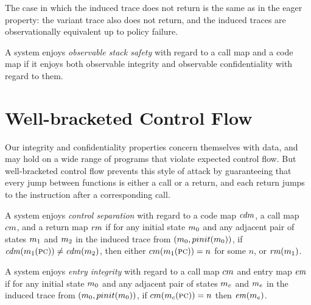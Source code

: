 \documentclass[acmsmall,review,anonymous]{acmart}\settopmatter{printfolios=true,printccs=false,printacmref=false}
\begin{document}
      The case in which the induced trace does not return is the same as in the
      eager property: the variant trace also does not return, and the induced
      traces are observationally equivalent up to policy failure.


      A system enjoys {\em observable stack safety} with regard to a call map
      and a code map if it enjoys both observable integrity and observable
      confidentiality with regard to them.

\section{Well-bracketed Control Flow}

  Our integrity and confidentiality properties concern themselves with data,
  and may hold on a wide range of programs that violate expected control flow.
  But well-bracketed control flow prevents this style of attack by guaranteeing
  that every jump between functions is either a call or a return, and each
  return jumps to the instruction after a corresponding call.


    A system enjoys {\em control separation} with regard to a code map
    \(\mathit{cdm}\), a call map \(cm\), and a return map \(\mathit{rm}\)
    if for any initial state \(m_0\) and any adjacent pair of states
    \(m_1\) and \(m_2\) in the induced trace from
    \((m_0,pinit(m_0))\), if \(\mathit{cdm}(m_1(\textsc{pc}))
    \not = \mathit{cdm}(m_2)\), then either \(cm(m_1(\textsc{pc})) = n\)
    for some \(n\), or \(\mathit{rm}(m_1)\).


    A system enjoys {\em entry integrity} with regard to a call map
    \(cm\) and entry map \(\mathit{em}\) if for any initial state
    \(m_0\) and any adjacent pair of states \(m_c\) and \(m_e\)
    in the induced trace from \((m_0,pinit(m_0))\), if
    \(cm(m_c(\textsc{pc})) = n\) then \(\mathit{em}(m_e)\).

\end{document}
